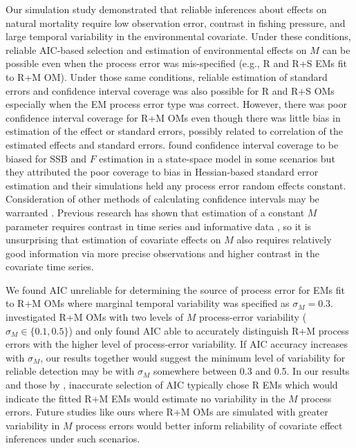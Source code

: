 \documentclass[
  12pt,
]{article}
\begin{document}
Our simulation study demonstrated that reliable inferences about effects on natural mortality require low observation error, contrast in fishing pressure, and large temporal variability in the environmental covariate. Under these conditions, reliable AIC-based selection and estimation of environmental effects on \(M\) can be possible even when the process error was mis-specified (e.g., R and R+S EMs fit to R+M OM). Under those same conditions, reliable estimation of standard errors and confidence interval coverage was also possible for R and R+S OMs especially when the EM process error type was correct. However, there was poor confidence interval coverage for R+M OMs even though there was little bias in estimation of the effect or standard errors, possibly related to correlation of the estimated effects and standard errors. \citet{cadiganetal24} found confidence interval coverage to be biased for SSB and \(F\) estimation in a state-space model in some scenarios but they attributed the poor coverage to bias in Hessian-based standard error estimation and their simulations held any process error random effects constant. Consideration of other methods of calculating confidence intervals may be warranted \citep[e.g.,][]{boykoomeara24}. Previous research has shown that estimation of a constant \(M\) parameter requires contrast in time series and informative data \citep{leeetal11}, so it is unsurprising that estimation of covariate effects on \(M\) also requires relatively good information via more precise observations and higher contrast in the covariate time series.

We found AIC unreliable for determining the source of process error for EMs fit to R+M OMs where marginal temporal variability was specified as \(\sigma_M = 0.3\). \citet{milleretal_inreview1} investigated R+M OMs with two levels of \(M\) process-error variability (\(\sigma_M \in \{0.1,0.5\}\)) and only found AIC able to accurately distinguish R+M process errors with the higher level of process-error variability. If AIC accuracy increases with \(\sigma_M\), our results together would suggest the minimum level of variability for reliable detection may be with \(\sigma_M\) somewhere between 0.3 and 0.5. In our results and those by \citet{milleretal_inreview1}, inaccurate selection of AIC typically chose R EMs which would indicate the fitted R+M EMs would estimate no variability in the \(M\) process errors. Future studies like ours where R+M OMs are simulated with greater variability in \(M\) process errors would better inform reliability of covariate effect inferences under such scenarios.
\end{document}
